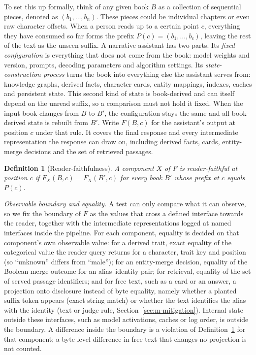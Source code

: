 \documentclass[sn-mathphys]{sn-jnl}%
\theoremstyle{thmstyleone}%
\theoremstyle{thmstyletwo}%
\theoremstyle{thmstylethree}%
\newtheorem{definition}{Definition}%
\begin{document}
To set this up formally, think of any given book $B$ as a collection of sequential pieces, denoted as $(b_1,\dots,b_n)$. These pieces could be individual chapters or even raw character offsets. When a person reads up to a certain point $c$, everything they have consumed so far forms the prefix $P(c)=(b_1,\dots,b_c)$, leaving the rest of the text as the unseen suffix. A narrative assistant has two parts. Its \emph{fixed configuration} is everything that does not come from the book: model weights and version, prompts, decoding parameters and algorithm settings. Its \emph{state-construction process} turns the book into everything else the assistant serves from: knowledge graphs, derived facts, character cards, entity mappings, indexes, caches and persistent state. This second kind of state is book-derived and can itself depend on the unread suffix, so a comparison must not hold it fixed. When the input book changes from $B$ to $B'$, the configuration stays the same and all book-derived state is rebuilt from $B'$. Write $F(B,c)$ for the assistant's output at position $c$ under that rule. It covers the final response and every intermediate representation the response can draw on, including derived facts, cards, entity-merge decisions and the set of retrieved passages.

\begin{definition}[Reader-faithfulness]\label{def:rf}
A component $X$ of $F$ is reader-faithful at position $c$ if $F_X(B,c)=F_X(B',c)$ for every book $B'$ whose prefix at $c$ equals $P(c)$.
\end{definition}

\emph{Observable boundary and equality.} A test can only compare what it can observe, so we fix the boundary of $F$ as the values that cross a defined interface towards the reader, together with the intermediate representations logged at named interfaces inside the pipeline. For each component, equality is decided on that component's own observable value: for a derived trait, exact equality of the categorical value the reader query returns for a character, trait key and position (so ``unknown'' differs from ``male''); for an entity-merge decision, equality of the Boolean merge outcome for an alias--identity pair; for retrieval, equality of the set of served passage identifiers; and for free text, such as a card or an answer, a projection onto disclosure instead of byte equality, namely whether a planted suffix token appears (exact string match) or whether the text identifies the alias with the identity (text or judge rule, Section~\ref{sec:m-mitigation}). Internal state outside these interfaces, such as model activations, caches or log order, is outside the boundary. A difference inside the boundary is a violation of Definition~\ref{def:rf} for that component; a byte-level difference in free text that changes no projection is not counted.
\end{document}

